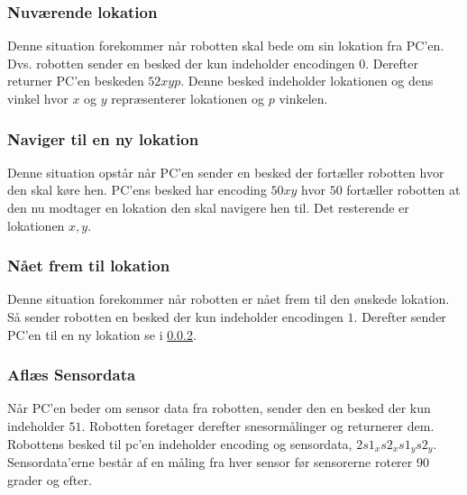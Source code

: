 \subsubsection{Nuværende lokation}
Denne situation forekommer når robotten skal bede om sin lokation fra PC'en.
Dvs. robotten sender en besked der kun indeholder encodingen $0$.
Derefter returner PC'en beskeden $52xyp$.
Denne besked indeholder lokationen og dens vinkel hvor $x$ og $y$ repræsenterer lokationen og $p$ vinkelen.

\subsubsection{Naviger til en ny lokation}\label{design:protokol_navigertilny}
Denne situation opstår når PC'en sender en besked der fortæller robotten hvor den skal køre hen.
PC'ens besked har encoding $50xy$ hvor $50$ fortæller robotten at den nu modtager en lokation den skal navigere hen til.
Det resterende er lokationen $x,y$.

\subsubsection{Nået frem til lokation}
Denne situation forekommer når robotten er nået frem til den ønskede lokation.
Så sender robotten en besked der kun indeholder encodingen $1$.
Derefter sender PC'en til en ny lokation se i \cref{design:protokol_navigertilny}.

\subsubsection{Aflæs Sensordata}
Når PC'en beder om sensor data fra robotten, sender den en besked der kun indeholder $51$.
Robotten foretager derefter snesormålinger og returnerer dem.
Robottens besked til pc'en indeholder encoding og sensordata, $2s1_x s2_x s1_y s2_y$.
Sensordata'erne består af en måling fra hver sensor før sensorerne roterer 90 grader og efter.